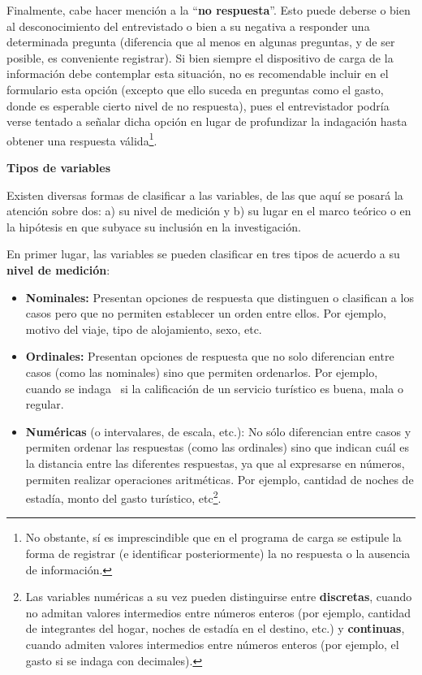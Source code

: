 \documentclass[
]{book}
\begin{document}
Finalmente, cabe hacer mención a la ``\textbf{no respuesta}''. Esto puede deberse o bien al desconocimiento del entrevistado o bien a su negativa a responder una determinada pregunta (diferencia que al menos en algunas preguntas, y de ser posible, es conveniente registrar). Si bien siempre el dispositivo de carga de la información debe contemplar esta situación, no es recomendable incluir en el formulario esta opción (excepto que ello suceda en preguntas como el gasto, donde es esperable cierto nivel de no respuesta), pues el entrevistador podría verse tentado a señalar dicha opción en lugar de profundizar la indagación hasta obtener una respuesta válida\footnote{No obstante, sí es imprescindible que en el programa de carga se estipule la forma de registrar (e identificar posteriormente) la no respuesta o la ausencia de información.}.

\textbf{Tipos de variables}

Existen diversas formas de clasificar a las variables, de las que aquí se posará la atención sobre dos: a) su nivel de medición y b) su lugar en el marco teórico o en la hipótesis en que subyace su inclusión en la investigación.

En primer lugar, las variables se pueden clasificar en tres tipos de acuerdo a su \textbf{nivel de medición}:

\begin{itemize}
\item
  \textbf{Nominales:} Presentan opciones de respuesta que distinguen o clasifican a los casos pero que no permiten establecer un orden entre ellos. Por ejemplo, motivo del viaje, tipo de alojamiento, sexo, etc.
\item
  \textbf{Ordinales:} Presentan opciones de respuesta que no solo diferencian entre casos (como las nominales) sino que permiten ordenarlos. Por ejemplo, cuando se indaga~ si la calificación de un servicio turístico es buena, mala o regular.
\item
  \textbf{Numéricas} (o intervalares, de escala, etc.): No sólo diferencian entre casos y permiten ordenar las respuestas (como las ordinales) sino que indican cuál es la distancia entre las diferentes respuestas, ya que al expresarse en números, permiten realizar operaciones aritméticas. Por ejemplo, cantidad de noches de estadía, monto del gasto turístico, etc\footnote{Las variables numéricas a su vez pueden distinguirse entre \textbf{discretas}, cuando no admitan valores intermedios entre números enteros (por ejemplo, cantidad de integrantes del hogar, noches de estadía en el destino, etc.) y \textbf{continuas}, cuando admiten valores intermedios entre números enteros (por ejemplo, el gasto si se indaga con decimales).}.
\end{itemize}
\end{document}

